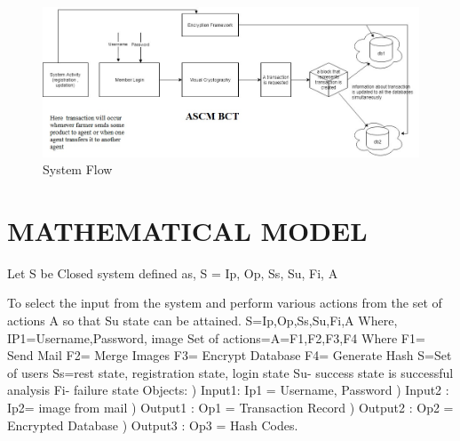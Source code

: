 \documentclass[oneside,a4paper,12pt]{report}
\begin{document}
\begin{center}
	\begin{figure}[!htbp]
		\centering
		\includegraphics[scale=0.75]{architecture2}
        \caption{System Flow}
	    \label{fig:System Flow}
	\end{figure}
\end{center}
\newpage

\section{MATHEMATICAL MODEL}

Let
\newline
S be Closed system defined as, S = { Ip, Op, Ss, Su, Fi, A}

To select the input from the system and perform various actions from the set of actions A so that Su state can be attained.
\newline 
S={Ip,Op,Ss,Su,Fi,A}
\newline
Where,
\newline   
IP1={Username,Password, image}
\newline
Set of actions=A={F1,F2,F3,F4}
\newline
Where
\newline
F1= Send Mail
\newline
F2= Merge Images
\newline
F3= Encrypt Database
\newline
F4= Generate Hash
\newline
S=Set of users
\newline
Ss={rest state, registration state, login state}
\newline
Su- success state is successful analysis
\newline
Fi- failure state 
\newline
Objects:
)	Input1: Ip1 = {Username, Password}
)	Input2 : Ip2= {image from mail}
)	Output1 : Op1 = Transaction Record 
)	Output2 : Op2 = Encrypted Database
)	Output3 : Op3 = Hash Codes.
\end{document}
